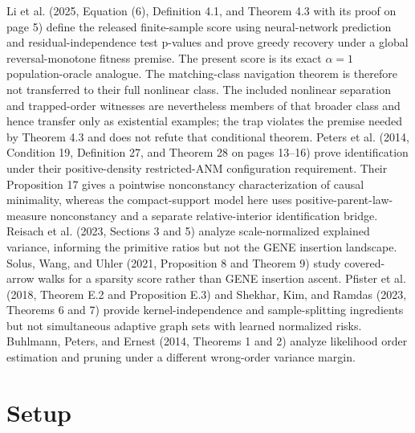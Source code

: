 \documentclass{article}
\begin{document}
Li et al. (2025, Equation (6), Definition 4.1, and Theorem 4.3 with its proof on page 5) define the released finite-sample score using neural-network prediction and residual-independence test p-values and prove greedy recovery under a global reversal-monotone fitness premise. The present score is its exact \(\alpha=1\) population-oracle analogue. The matching-class navigation theorem is therefore not transferred to their full nonlinear class. The included nonlinear separation and trapped-order witnesses are nevertheless members of that broader class and hence transfer only as existential examples; the trap violates the premise needed by Theorem 4.3 and does not refute that conditional theorem. Peters et al. (2014, Condition 19, Definition 27, and Theorem 28 on pages 13--16) prove identification under their positive-density restricted-ANM configuration requirement. Their Proposition 17 gives a pointwise nonconstancy characterization of causal minimality, whereas the compact-support model here uses positive-parent-law-measure nonconstancy and a separate relative-interior identification bridge. Reisach et al. (2023, Sections 3 and 5) analyze scale-normalized explained variance, informing the primitive ratios but not the GENE insertion landscape. Solus, Wang, and Uhler (2021, Proposition 8 and Theorem 9) study covered-arrow walks for a sparsity score rather than GENE insertion ascent. Pfister et al. (2018, Theorem E.2 and Proposition E.3) and Shekhar, Kim, and Ramdas (2023, Theorems 6 and 7) provide kernel-independence and sample-splitting ingredients but not simultaneous adaptive graph sets with learned normalized risks. Buhlmann, Peters, and Ernest (2014, Theorems 1 and 2) analyze likelihood order estimation and pruning under a different wrong-order variance margin.

\section{Setup}
\end{document}
